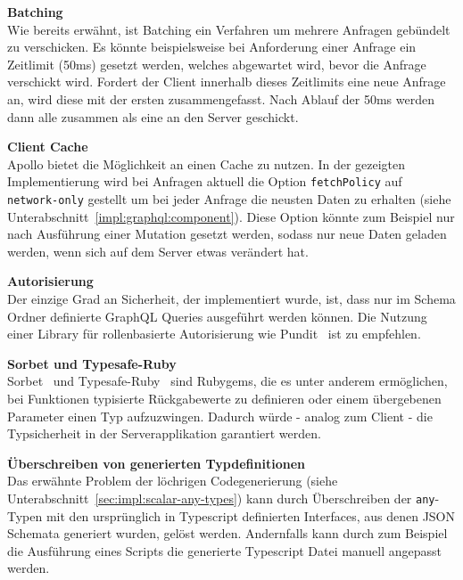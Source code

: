 \textbf{Batching} \ \\
Wie bereits erwähnt, ist Batching ein Verfahren um mehrere Anfragen gebündelt zu verschicken. Es könnte beispielsweise bei Anforderung einer Anfrage ein Zeitlimit (50ms) gesetzt werden, welches abgewartet wird, bevor die Anfrage verschickt wird. Fordert der Client innerhalb dieses Zeitlimits eine neue Anfrage an, wird diese mit der ersten zusammengefasst. Nach Ablauf der 50ms werden dann alle zusammen als eine an den Server geschickt. 

\textbf{Client Cache} \ \\
Apollo bietet die Möglichkeit an einen Cache zu nutzen. In der gezeigten Implementierung wird bei Anfragen aktuell die Option \texttt{fetchPolicy} auf \texttt{network\--only} gestellt um bei jeder Anfrage die neusten Daten zu erhalten (siehe Unterabschnitt~\ref{impl:graphql:component}). Diese Option könnte zum Beispiel nur nach Ausführung einer Mutation gesetzt werden, sodass nur neue Daten geladen werden, wenn sich auf dem Server etwas verändert hat.
	
\textbf{Autorisierung} \ \\
Der einzige Grad an Sicherheit, der implementiert wurde, ist, dass nur im Schema Ordner definierte GraphQL Queries ausgeführt werden können. Die Nutzung einer Library für rollenbasierte Autorisierung wie Pundit~\cite{pundit} ist zu empfehlen.

\textbf{Sorbet und Typesafe-Ruby} \ \\
Sorbet~\cite{sorbet} und Typesafe-Ruby~\cite{typesafe-ruby} sind Rubygems, die es unter anderem ermöglichen, bei Funktionen typisierte Rückgabewerte zu definieren oder einem übergebenen Parameter einen Typ aufzuzwingen. Dadurch würde - analog zum Client - die Typsicherheit in der Serverapplikation garantiert werden.

\textbf{Überschreiben von generierten Typdefinitionen} \ \\
Das erwähnte Problem der löchrigen Codegenerierung (siehe Unterabschnitt~\ref{sec:impl:scalar-any-types}) kann durch Überschreiben der \texttt{any}-Typen mit den ursprünglich in Typescript definierten Interfaces, aus denen JSON Schemata generiert wurden, gelöst werden. Andernfalls kann durch zum Beispiel die Ausführung eines Scripts die generierte Typescript Datei manuell angepasst werden.

